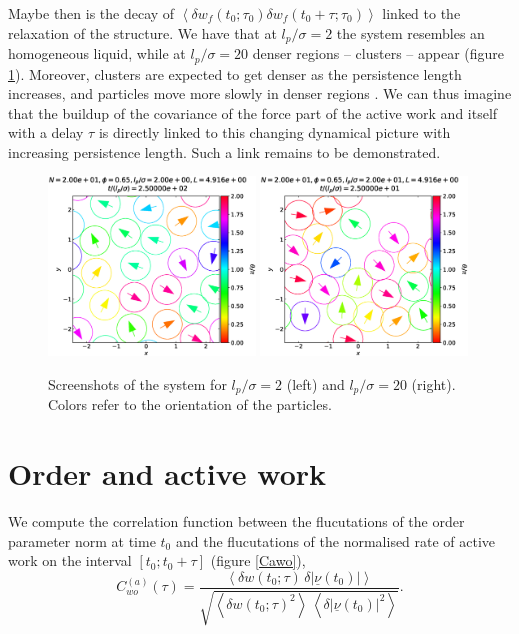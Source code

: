 \documentclass[10pt]{article}
\begin{document}
Maybe then is the decay of $\left<\delta w_f(t_0; \tau_0) \delta w_f(t_0 + \tau; \tau_0)\right>$ linked to the relaxation of the structure. We have that at $l_p/\sigma = 2$ the system resembles an homogeneous liquid, while at $l_p/\sigma = 20$ denser regions -- clusters -- appear (figure \ref{screenshots}). Moreover, clusters are expected to get denser as the persistence length increases, and particles move more slowly in denser regions \cite{cates_motility-induced_2015}. We can thus imagine that the buildup of the covariance of the force part of the active work and itself with a delay $\tau$ is directly linked to this changing dynamical picture with increasing persistence length. Such a link remains to be demonstrated.

\begin{figure}[H]
\centering
\includegraphics[width=0.49\textwidth]{o_Nm2000_Dk6500_Ll2000.eps}
\hfill
\includegraphics[width=0.49\textwidth]{o_Nm2000_Dk6500_Lm2000.eps}
\caption{Screenshots of the system for $l_p/\sigma = 2$ (left) and $l_p/\sigma = 20$ (right). Colors refer to the orientation of the particles.}
\label{screenshots}
\end{figure}

\section{Order and active work}

We compute the correlation function between the flucutations of the order parameter norm at time $t_0$ and the flucutations of the normalised rate of active work on the interval $[t_0; t_0 + \tau]$ (figure \ref{Cawo}),
\begin{equation}
C^{(a)}_{wo}(\tau) = \frac{\left<\delta w(t_0; \tau) \, \delta |\underline{\nu}(t_0)|\right>}{\sqrt{\left<\delta w(t_0; \tau)^2\right> \, \left<\delta |\underline{\nu}(t_0)|^2\right>}}.
\label{eqCawo}
\end{equation}
\end{document}
